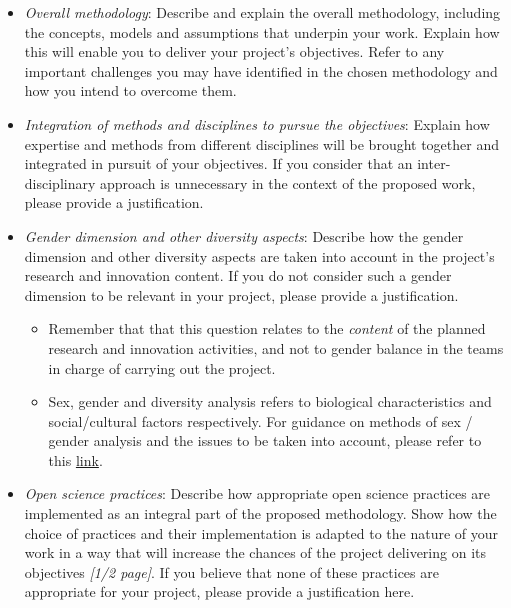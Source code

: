 \documentclass[12pt,draftproposal]{msca-pf}
\begin{document}
\begin{itemize}
    \item \emph{Overall methodology}: Describe and explain the overall methodology,
    including the concepts, models and assumptions that underpin your work.
    Explain how this will enable you to deliver your project’s objectives. Refer
    to any important challenges you may have identified in the chosen methodology
    and how you intend to overcome them.

    \item \emph{Integration of methods and disciplines to pursue the objectives}:
    Explain how expertise and methods from different disciplines will be brought
    together and integrated in pursuit of your objectives. If you consider that
    an inter-disciplinary\footnotemark{} approach is unnecessary in the
    context of the proposed work, please provide a justification.


    \item \emph{Gender dimension and other diversity aspects}: Describe how the
    gender dimension and other diversity aspects are taken into account in the
    project's research and innovation content. If you do not consider such a
    gender dimension to be relevant in your project, please provide a
    justification.
    \begin{itemize}
        \item Remember that that this question relates to the \emph{content} of the
        planned research and innovation activities, and not to gender balance
        in the teams in charge of carrying out the project.

        \item  Sex, gender and diversity analysis refers to biological
        characteristics and social/cultural factors respectively. For guidance on
        methods of sex / gender analysis and the issues to be taken into account,
        please refer to this
        \href{https://op.europa.eu/en/publication-detail/-/publication/33b4c99f-2e66-11eb-b27b-01aa75ed71a1/language-en}{link}.
    \end{itemize}

    \item \emph{Open science practices}: Describe how appropriate open science
    practices are implemented as an integral part of the proposed methodology.
    Show how the choice of practices and their implementation is adapted to the
    nature of your work in a way that will increase the chances of the project
    delivering on its objectives \emph{[1/2 page]}. If you believe that none of
    these practices are appropriate for your project, please provide a justification
    here.


\end{itemize}
\end{document}
